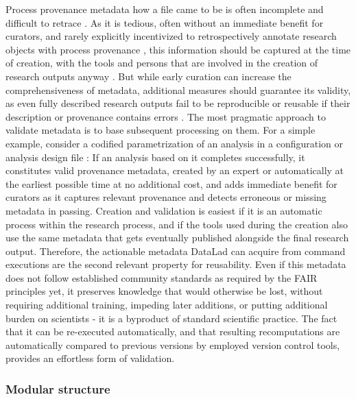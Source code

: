 Process provenance metadata how a file came to be is often incomplete and difficult to retrace \citep{hardwicke2018data}.
As it is tedious, often without an immediate benefit for curators, and rarely explicitly incentivized to retrospectively annotate research objects with process provenance \citep{edwards2011science, san2009long}, this information should be captured at the time of creation, with the tools and persons that are involved in the creation of research outputs anyway \citep{dallas2016digital}.
But while early curation can increase the comprehensiveness of metadata, additional measures should guarantee its validity, as even fully described research outputs fail to be reproducible or reusable if their description or provenance contains errors \citep[see, e.g.,][]{manninen2017reproducibility}.
The most pragmatic approach to validate metadata is to base subsequent processing on them.
For a simple example, consider a codified parametrization of an analysis in a configuration or analysis design file  \citep[see, e.g.,][]{jas2018reproducible}:
If an analysis based on it completes successfully, it constitutes valid provenance metadata, created by an expert or automatically at the earliest possible time at no additional cost, and adds immediate benefit for curators as it captures relevant provenance and detects erroneous or missing metadata in passing.
Creation and validation is easiest if it is an automatic process within the research process, and if the tools used during the creation also use the same metadata that gets eventually published alongside the final research output.
Therefore, the actionable metadata DataLad can acquire from command executions are the second relevant property for reusability.
Even if this metadata does not follow established community standards as required by the \gls{FAIR} principles yet, it preserves knowledge that would otherwise be lost, without requiring additional training, impeding later additions, or putting additional burden on scientists - it is a byproduct of standard scientific practice.
The fact that it can be re-executed automatically, and that resulting recomputations are automatically compared to previous versions by employed version control tools, provides an effortless form of validation.


\subsubsection{Modular structure}

